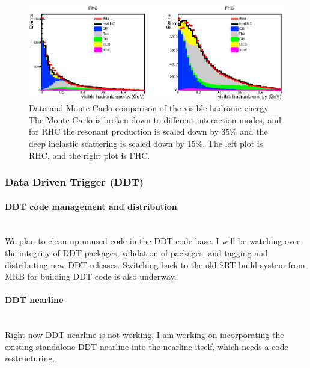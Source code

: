\documentclass[12pt,a4paper,final]{iopart}
\begin{document}
\begin{figure}
  \centering
  \includegraphics[width=.8\textwidth]{figures/2016/ehad_scaled.eps}
  \caption{Data and Monte Carlo comparison of the visible hadronic energy. The Monte Carlo is broken down to different interaction modes, and for RHC the resonant production is scaled down by 35\% and the deep inelastic scattering is scaled down by 15\%. The left plot is RHC, and the right plot is FHC.}
  \label{fig:2016ehadscaled}
\end{figure}


\subsubsection{Data Driven Trigger (DDT)}

\paragraph{\textbf{DDT code management and distribution}}\hspace*{\fill}\\
We plan to clean up unused code in the DDT code base. I will be watching over the integrity of DDT packages, validation of packages, and tagging and distributing new DDT releases. Switching back to the old SRT build system from MRB for building DDT code is also underway.

\paragraph{\textbf{DDT nearline}}\hspace*{\fill}\\
Right now DDT nearline is not working. I am working on incorporating the existing standalone DDT nearline into the nearline itself, which needs a code restructuring.

\clearpage
\vspace*{\fill}
\begin{Huge}
\end{Huge}
\vspace*{\fill}
\clearpage
\end{document}
